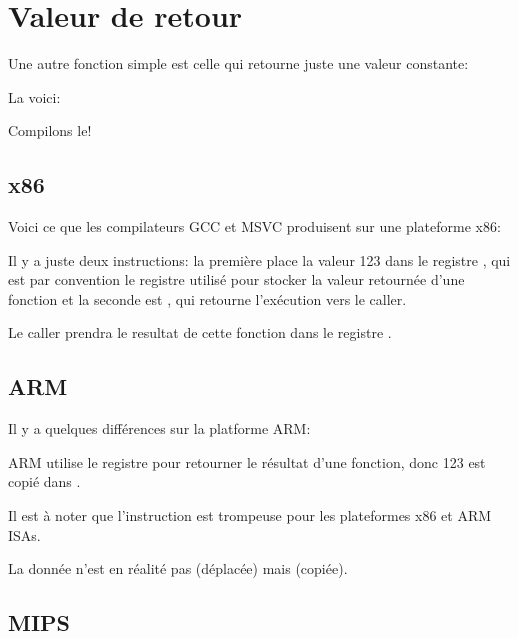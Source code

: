 ﻿\section{Valeur de retour}
\label{ret_val_func}

Une autre fonction simple est celle qui retourne juste une valeur constante:

La voici:



Compilons le!

\subsection{x86}

Voici ce que les compilateurs GCC et MSVC produisent sur une plateforme x86:



Il y a juste deux instructions: la première place la valeur 123 dans le registre \EAX, qui est par convention le registre utilisé pour stocker la valeur retournée d'une fonction et la seconde est \RET, qui retourne l'exécution vers le \gls{caller}.

Le caller prendra le resultat de cette fonction dans le registre \EAX.

\subsection{ARM}

Il y a quelques différences sur la platforme ARM:



ARM utilise le registre  pour retourner le résultat d'une fonction, donc 123 est copié dans .


Il est à noter que l'instruction \MOV est trompeuse pour les plateformes x86 et ARM \ac{ISA}s.

La donnée n'est en réalité pas  (déplacée) mais  (copiée).

\subsection{MIPS}

